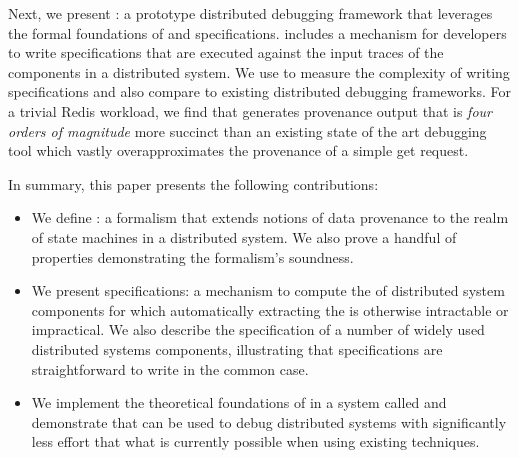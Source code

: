 Next, we present \fluent{}: a prototype distributed debugging framework that
leverages the formal foundations of \watprovenance{} and \watprovenance{}
specifications. \fluent{} includes a mechanism for developers to write
\watprovenance{} specifications that are executed against the input traces of
the components in a distributed system. We use \fluent{} to measure the
complexity of writing \watprovenance{} specifications and also compare
\fluent{} to existing distributed debugging frameworks. For a trivial Redis
workload, we find that \fluent{} generates provenance output that is \emph{four
orders of magnitude} more succinct than an existing state of the art debugging
tool which vastly overapproximates the provenance of a simple get request.

In summary, this paper presents the following contributions:
\begin{itemize}
  \item
    We define \watprovenance{}: a formalism that extends notions of data
    provenance to the realm of state machines in a distributed system. We also
    prove a handful of properties demonstrating the formalism's soundness.
  \item
    We present \watprovenance{} specifications: a mechanism to compute the
    \watprovenance{} of distributed system components for which automatically
    extracting the \watprovenance{} is otherwise intractable or impractical. We
    also describe the \watprovenance{} specification of a number of widely used
    distributed systems components, illustrating that \watprovenance{}
    specifications are straightforward to write in the common case.
  \item
    We implement the theoretical foundations of \watprovenance{} in a system
    called \fluent{} and demonstrate that \fluent{} can be used to debug
    distributed systems with significantly less effort that what is currently
    possible when using existing techniques.
\end{itemize}
